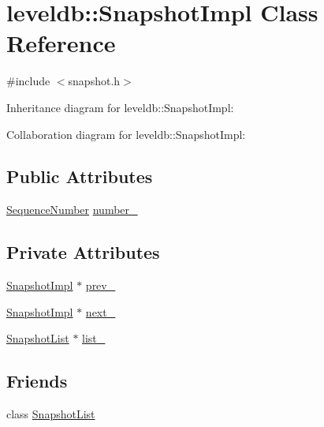 \hypertarget{classleveldb_1_1_snapshot_impl}{\section{leveldb\-:\-:Snapshot\-Impl Class Reference}
\label{classleveldb_1_1_snapshot_impl}
}


{\ttfamily \#include $<$snapshot.\-h$>$}



Inheritance diagram for leveldb\-:\-:Snapshot\-Impl\-:


Collaboration diagram for leveldb\-:\-:Snapshot\-Impl\-:
\subsection*{Public Attributes}
\begin{DoxyCompactItemize}
\item 
\hyperlink{namespaceleveldb_a5481ededd221c36d652c371249f869fa}{Sequence\-Number} \hyperlink{classleveldb_1_1_snapshot_impl_aa31dca969679d05d17c4c0eb1443a96e}{number\-\_\-}
\end{DoxyCompactItemize}
\subsection*{Private Attributes}
\begin{DoxyCompactItemize}
\item 
\hyperlink{classleveldb_1_1_snapshot_impl}{Snapshot\-Impl} $\ast$ \hyperlink{classleveldb_1_1_snapshot_impl_a562cbefac390343cf1d8cd543b9a7d32}{prev\-\_\-}
\item 
\hyperlink{classleveldb_1_1_snapshot_impl}{Snapshot\-Impl} $\ast$ \hyperlink{classleveldb_1_1_snapshot_impl_a4cd084fe53c616fca125a50cf6f64cb2}{next\-\_\-}
\item 
\hyperlink{classleveldb_1_1_snapshot_list}{Snapshot\-List} $\ast$ \hyperlink{classleveldb_1_1_snapshot_impl_ac2b7d24074cfe0dcdce4be956016a5d1}{list\-\_\-}
\end{DoxyCompactItemize}
\subsection*{Friends}
\begin{DoxyCompactItemize}
\item 
class \hyperlink{classleveldb_1_1_snapshot_impl_abe14b2fb5e32159324c619e1a42327a0}{Snapshot\-List}
\end{DoxyCompactItemize}
